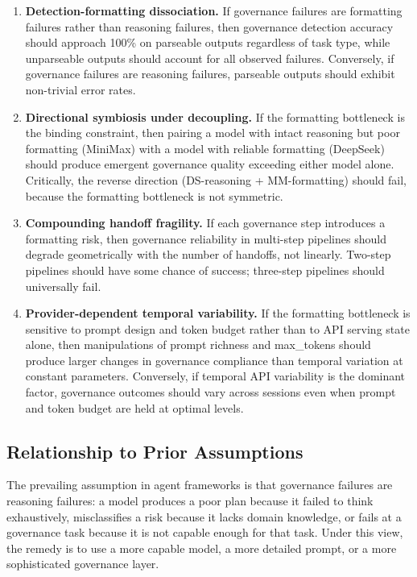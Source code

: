 \documentclass[11pt,a4paper]{article}
\begin{document}
\begin{enumerate}[label=\textbf{P\arabic*:}, leftmargin=*]
\item \textbf{Detection-formatting dissociation.} If governance failures are formatting failures rather than reasoning failures, then governance detection accuracy should approach 100\% on parseable outputs regardless of task type, while unparseable outputs should account for all observed failures. Conversely, if governance failures are reasoning failures, parseable outputs should exhibit non-trivial error rates.
\item \textbf{Directional symbiosis under decoupling.} If the formatting bottleneck is the binding constraint, then pairing a model with intact reasoning but poor formatting (MiniMax) with a model with reliable formatting (DeepSeek) should produce emergent governance quality exceeding either model alone. Critically, the reverse direction (DS-reasoning + MM-formatting) should fail, because the formatting bottleneck is not symmetric.
\item \textbf{Compounding handoff fragility.} If each governance step introduces a formatting risk, then governance reliability in multi-step pipelines should degrade geometrically with the number of handoffs, not linearly. Two-step pipelines should have some chance of success; three-step pipelines should universally fail.
\item \textbf{Provider-dependent temporal variability.} If the formatting bottleneck is sensitive to prompt design and token budget rather than to API serving state alone, then manipulations of prompt richness and max\_tokens should produce larger changes in governance compliance than temporal variation at constant parameters. Conversely, if temporal API variability is the dominant factor, governance outcomes should vary across sessions even when prompt and token budget are held at optimal levels.
\end{enumerate}

\subsection{Relationship to Prior Assumptions}

The prevailing assumption in agent frameworks is that governance failures are reasoning failures: a model produces a poor plan because it failed to think exhaustively, misclassifies a risk because it lacks domain knowledge, or fails at a governance task because it is not capable enough for that task. Under this view, the remedy is to use a more capable model, a more detailed prompt, or a more sophisticated governance layer.
\end{document}
